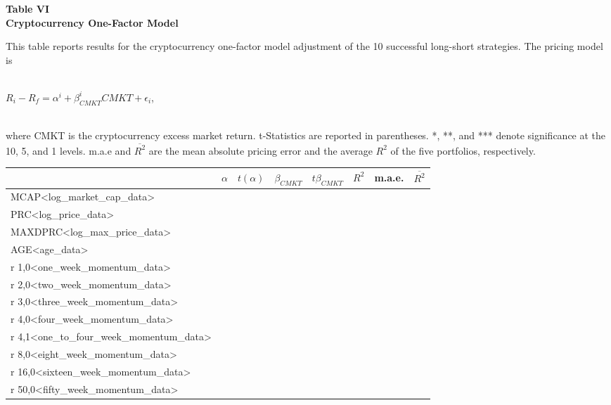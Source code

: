 \documentclass{article}
\begin{document}
    \begin{center}
        \textbf{
        Table VI
        \\
        Cryptocurrency One-Factor Model
        }
        \begin{justify}
            \footnotesize{
                This table reports results for the cryptocurrency one-factor model adjustment of the 10 successful long-short strategies. The pricing model is
            }
            \\
            \\
            \footnotesize{
                \centerline{
                    $R_i-R_f=\alpha^i+\beta^i_{CMKT}CMKT+\epsilon_i$,
                }
            }
            \\
            \footnotesize{
                where CMKT is the cryptocurrency excess market return. t-Statistics are reported in parentheses. *, **, and *** denote significance at the 10, 5, and 1 levels. m.a.e and $\overline{R^2}$ are the mean absolute pricing error and the average $R^2$ of the five portfolios, respectively.
            }
        \end{justify}
        \-
        \begin{tabular}{lccccccr}
            \toprule
            & $\alpha$ & $t(\alpha)$ & $\beta_{CMKT}$ & $t\beta_{CMKT}$ & $R^2$ & m.a.e. & $\overline{R^2}$
            \\
            \midrule
            MCAP<log_market_cap_data>
            \\
            PRC<log_price_data>
            \\
            MAXDPRC<log_max_price_data>
            \\
            AGE<age_data>
            \\
            r 1,0<one_week_momentum_data>
            \\
            r 2,0<two_week_momentum_data>
            \\
            r 3,0<three_week_momentum_data>
            \\
            r 4,0<four_week_momentum_data>
            \\
            r 4,1<one_to_four_week_momentum_data>
            \\
            r 8,0<eight_week_momentum_data>
            \\
            r 16,0<sixteen_week_momentum_data>
            \\
            r 50,0<fifty_week_momentum_data>

\end{tabular}
\end{center}
\end{document}
